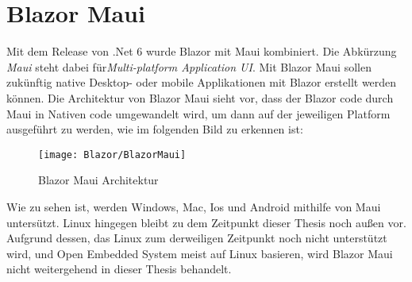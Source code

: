 \section{Blazor Maui}
\label{sec:blazormaui}
Mit dem Release von .Net 6 wurde Blazor mit Maui kombiniert. Die Abkürzung \emph{Maui} steht dabei
für\emph{Multi-platform Application UI}. Mit
Blazor Maui sollen zukünftig native Desktop-  oder mobile Applikationen mit Blazor erstellt werden
können.
\newline
\newline
Die Architektur von Blazor Maui sieht vor, dass der Blazor code durch Maui in Nativen code
umgewandelt wird, um dann auf der jeweiligen Platform ausgeführt zu werden, wie im folgenden Bild
zu erkennen ist:
\newpage
\begin{figure}[h]
    \centering
    \texttt{[image: Blazor/BlazorMaui]}
    \caption[Blazor Maui Architektur]{Blazor Maui Architektur}
    \label{img:BlazorMaui}
\end{figure}

Wie zu sehen ist, werden Windows, Mac, Ios und Android mithilfe von Maui untersützt. Linux
hingegen bleibt zu dem Zeitpunkt dieser Thesis noch außen vor.
\newline
\newline
Aufgrund dessen, das Linux zum derweiligen Zeitpunkt noch nicht unterstützt wird, und Open
Embedded System meist auf Linux basieren, wird Blazor Maui nicht weitergehend in dieser Thesis
behandelt.
